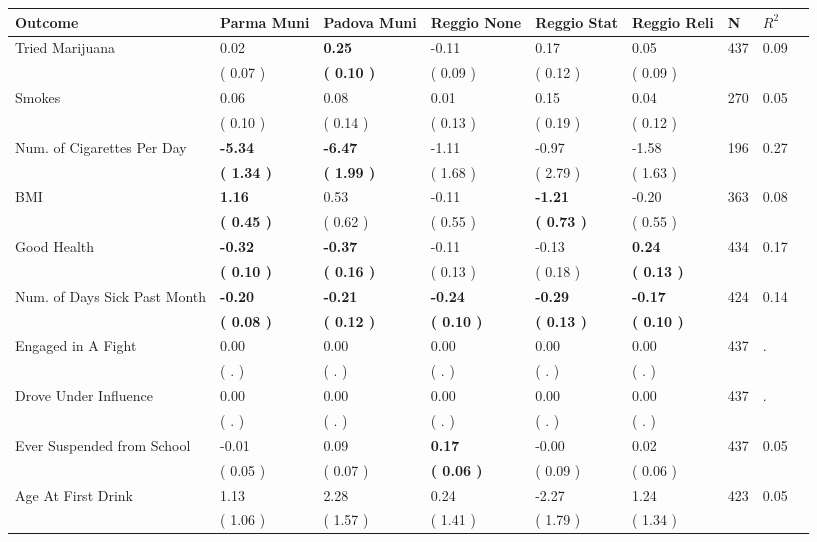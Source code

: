 \begin{tabular}{L{6.2cm} C{1.8cm} C{1.8cm} C{1.8cm} C{1.8cm} C{1.8cm} C{1.8cm} C{0.3cm} C{0.3cm}}
\toprule
 \textbf{Outcome} & \textbf{Parma Muni} & \textbf{Padova Muni} & \textbf{Reggio None} & \textbf{Reggio Stat} & \textbf{Reggio Reli} & \textbf{N} & \textbf{$ R^2$} \\
\midrule
Tried Marijuana &      0.02 & \textbf{     0.25} &     -0.11 &      0.17 &      0.05  & 437 &       0.09 \\ 
 & (     0.07 ) & \textbf{(     0.10 )} & (     0.09 ) & (     0.12 ) & (     0.09 )  & \\
Smokes &      0.06 &      0.08 &      0.01 &      0.15 &      0.04  & 270 &       0.05 \\ 
 & (     0.10 ) & (     0.14 ) & (     0.13 ) & (     0.19 ) & (     0.12 )  & \\
Num. of Cigarettes Per Day & \textbf{    -5.34} & \textbf{    -6.47} &     -1.11 &     -0.97 &     -1.58  & 196 &       0.27 \\ 
 & \textbf{(     1.34 )} & \textbf{(     1.99 )} & (     1.68 ) & (     2.79 ) & (     1.63 )  & \\
BMI & \textbf{     1.16} &      0.53 &     -0.11 & \textbf{    -1.21} &     -0.20  & 363 &       0.08 \\ 
 & \textbf{(     0.45 )} & (     0.62 ) & (     0.55 ) & \textbf{(     0.73 )} & (     0.55 )  & \\
Good Health & \textbf{    -0.32} & \textbf{    -0.37} &     -0.11 &     -0.13 & \textbf{     0.24}  & 434 &       0.17 \\ 
 & \textbf{(     0.10 )} & \textbf{(     0.16 )} & (     0.13 ) & (     0.18 ) & \textbf{(     0.13 )}  & \\
Num. of Days Sick Past Month & \textbf{    -0.20} & \textbf{    -0.21} & \textbf{    -0.24} & \textbf{    -0.29} & \textbf{    -0.17}  & 424 &       0.14 \\ 
 & \textbf{(     0.08 )} & \textbf{(     0.12 )} & \textbf{(     0.10 )} & \textbf{(     0.13 )} & \textbf{(     0.10 )}  & \\
Engaged in A Fight &      0.00 &      0.00 &      0.00 &      0.00 &      0.00  & 437 &          . \\ 
 & (        . ) & (        . ) & (        . ) & (        . ) & (        . )  & \\
Drove Under Influence &      0.00 &      0.00 &      0.00 &      0.00 &      0.00  & 437 &          . \\ 
 & (        . ) & (        . ) & (        . ) & (        . ) & (        . )  & \\
Ever Suspended from School &     -0.01 &      0.09 & \textbf{     0.17} &     -0.00 &      0.02  & 437 &       0.05 \\ 
 & (     0.05 ) & (     0.07 ) & \textbf{(     0.06 )} & (     0.09 ) & (     0.06 )  & \\
Age At First Drink &      1.13 &      2.28 &      0.24 &     -2.27 &      1.24  & 423 &       0.05 \\ 
 & (     1.06 ) & (     1.57 ) & (     1.41 ) & (     1.79 ) & (     1.34 )  & \\
\bottomrule
\end{tabular}
